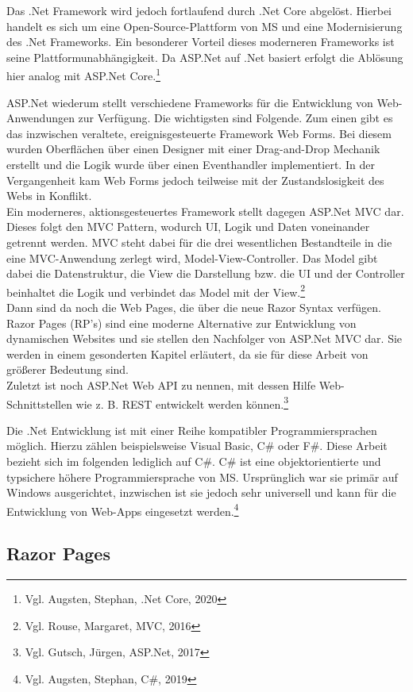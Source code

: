 \documentclass[a4paper,
12pt,
oneside]
{article}
\newcommand{\sPar}{\par\vspace*{6pt}}
\begin{document}
	Das .Net Framework wird jedoch fortlaufend durch .Net Core abgelöst. Hierbei handelt es sich um eine Open-Source-Plattform von MS und eine Modernisierung des .Net Frameworks. Ein besonderer Vorteil dieses moderneren Frameworks ist seine Plattformunabhängigkeit. Da ASP.Net auf .Net basiert erfolgt die Ablösung hier analog mit ASP.Net Core.\footnote{Vgl. Augsten, Stephan, .Net Core, 2020} \sPar
	ASP.Net wiederum stellt verschiedene Frameworks für die Entwicklung von Web-Anwendungen zur Verfügung. Die wichtigsten sind Folgende. Zum einen gibt es das inzwischen veraltete, ereignisgesteuerte Framework \glqq Web Forms\grqq. Bei diesem wurden Oberflächen über einen Designer mit einer Drag-and-Drop Mechanik erstellt und die Logik wurde über einen Eventhandler implementiert. In der Vergangenheit kam Web Forms jedoch teilweise mit der Zustandslosigkeit des Webs in Konflikt. \\
	Ein moderneres, aktionsgesteuertes Framework stellt dagegen ASP.Net MVC dar. Dieses folgt den MVC Pattern, wodurch UI, Logik und Daten voneinander getrennt werden. MVC steht dabei für die drei wesentlichen Bestandteile in die eine MVC-Anwendung zerlegt wird, \glqq Model-View-Controller\grqq. Das Model gibt dabei die Datenstruktur, die View die Darstellung bzw. die UI und der Controller beinhaltet die Logik und verbindet das Model mit der View.\footnote{Vgl. Rouse, Margaret, MVC, 2016} \\
	Dann sind da noch die Web Pages, die über die neue Razor Syntax verfügen. Razor Pages (RP's) sind eine moderne Alternative zur Entwicklung von dynamischen Websites und sie stellen den Nachfolger von ASP.Net MVC dar. Sie werden in einem gesonderten Kapitel erläutert, da sie für diese Arbeit von größerer Bedeutung sind. \\
	Zuletzt ist noch ASP.Net Web API zu nennen, mit dessen Hilfe Web-Schnittstellen wie z. B. REST entwickelt werden können.\footnote{Vgl. Gutsch, Jürgen, ASP.Net, 2017} \sPar
	Die .Net Entwicklung ist mit einer Reihe kompatibler Programmiersprachen möglich. Hierzu zählen beispielsweise Visual Basic, C\# oder F\#. Diese Arbeit bezieht sich im folgenden lediglich auf C\#. C\# ist eine objektorientierte und typsichere höhere Programmiersprache von MS. Ursprünglich war sie primär auf Windows ausgerichtet, inzwischen ist sie jedoch sehr universell und kann für die Entwicklung von Web-Apps eingesetzt werden.\footnote{Vgl. Augsten, Stephan, C\#, 2019}
	
	
	
	\subsection{Razor Pages}
	
\end{document}
